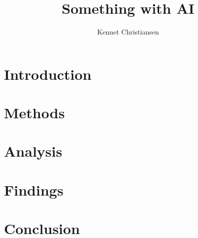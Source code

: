 \documentclass[a4paper, twocolumn]{article}
\author{Kennet Christiansen}
\title{Something with AI}
\begin{document}
\twocolumn[
    \begin{@twocolumnfalse}
        \maketitle
        \begin{abstract}
            
        \end{abstract}
    \end{@twocolumnfalse}
    \vspace{1cm}
]


\section{Introduction\label{sec:Introduction}}

\section{Methods\label{sec:Methods}}

\section{Analysis\label{sec:Analysis}}

\section{Findings\label{sec:Findings}}

\section{Conclusion\label{sec:Conclusion}}

\printbibliography
\end{document}
